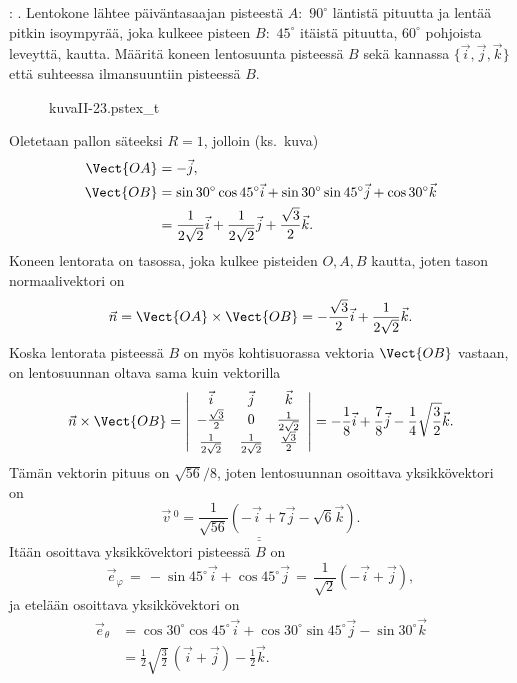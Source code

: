{}
\begin{Exa}: . Lentokone lähtee päiväntasaajan pisteestä $A:$ $90^\circ$ 
läntistä pituutta ja lentää pitkin isoympyrää, joka kulkeee pisteen  $B:$ $45^\circ$ itäistä
pituutta, $60^\circ$ pohjoista leveyttä, kautta. Määritä koneen lentosuunta pisteessä $B$ sekä
kannassa $\{\vec i, \vec j, \vec k\}$ että suhteessa ilmansuuntiin pisteessä $B$.
\end{Exa}
\begin{figure}[H]
\begin{center}
{kuvaII-23.pstex_t}
\end{center}
\end{figure}
\ratk Oletetaan pallon säteeksi $R=1$, jolloin (ks.\ kuva)
\begin{align*}
\Vect{OA} &= - \vec j, \\
\Vect{OB} &= \sin{30^\circ}\cos{45^\circ} \vec i 
+ \sin{30^\circ}\sin{45^\circ} \vec j + \cos{30^\circ} \vec k \\
&= \frac{1}{2\sqrt{2}} \vec i + \frac{1}{2\sqrt{2}} \vec j +
\frac{\sqrt{3}}{2} \vec k.
\end{align*}
Koneen lentorata on tasossa, joka kulkee pisteiden $O, A, B$ kautta, joten tason
normaalivektori on
\[
\vec n = \Vect{OA} \times \Vect{OB} 
       = -\frac{\sqrt{3}}{2}\vec i + \frac{1}{2\sqrt{2}}\vec k.
\]
Koska lentorata pisteessä $B$ on myös kohtisuorassa vektoria $\Vect{OB}$ vastaan, on
lentosuunnan oltava sama kuin vektorilla
\[
\vec n\times\Vect{OB} 
   = \left|\begin{array}{ccc}
     \vec i & \vec j & \vec k \\
     -\tfrac{\sqrt{3}}{2} & 0 & \tfrac{1}{2\sqrt{2}} \\
     \tfrac{1}{2\sqrt{2}} & \tfrac{1}{2\sqrt{2}} & \tfrac{\sqrt{3}}{2}
     \end{array} \right|
   = -\frac{1}{8}\vec i + \frac{7}{8}\vec j - \frac{1}{4}\sqrt{\frac{3}{2}}\vec k.
\]
Tämän vektorin pituus on $\sqrt{56}/8$, joten lentosuunnan osoittava yksikkövektori on
\[
\underline{\underline{\vec v\,^0 = \frac{1}{\sqrt{56}}(-\vec i + 7\vec j -\sqrt{6}\vec k)}}.
\]
Itään osoittava yksikkövektori pisteessä $B$ on
\[
\vec e_\varphi \,=\, - \sin{45^\circ} \vec i + \cos{45^\circ} \vec j 
               \,=\, \frac{1}{\sqrt{2}}(-\vec i + \vec j),
\]
ja etelään osoittava yksikkövektori on
\begin{align*}
\vec e_\theta &= \cos{30^\circ} \cos{45^\circ} \vec i +
\cos{30^\circ} \sin{45^\circ} \vec j - \sin{30^\circ}\vec k \\
&= \frac{1}{2}\sqrt{\frac{3}{2}}\,(\vec i + \vec j) - \frac{1}{2} \vec k.
\end{align*}
